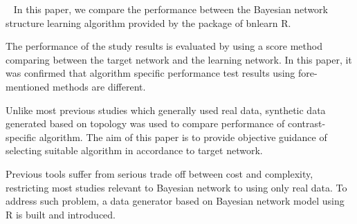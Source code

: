 \vspace{1cm} {\small \ \indent
In this paper, we compare the performance between the Bayesian network structure learning algorithm provided by the package of bnlearn R.

The performance of the study results is evaluated by using a score method comparing between the target network and the learning network. In this paper, it was confirmed that algorithm specific performance test results using fore-mentioned methods are different.

Unlike most previous studies which generally used real data, synthetic data generated based on topology was used to compare performance of contrast-specific algorithm. The aim of this paper is to provide objective guidance of selecting suitable algorithm in accordance to target network.

Previous tools suffer from serious trade off between cost and complexity, restricting most studies relevant to Bayesian network to using only real data. To address such problem, a data generator based on Bayesian network model using R is built and introduced.
} 